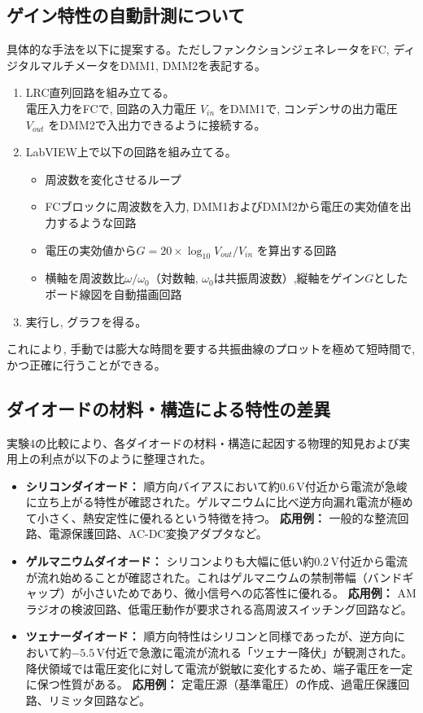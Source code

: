 \subsection{ゲイン特性の自動計測について}
具体的な手法を以下に提案する。ただしファンクションジェネレータをFC, ディジタルマルチメータをDMM1, DMM2を表記する。
\begin{enumerate}
    \item  LRC直列回路を組み立てる。\\
    電圧入力をFCで,
    回路の入力電圧 $V_{in}$ をDMM1で,
    コンデンサの出力電圧 $V_{out}$ をDMM2で入出力できるように接続する。
    \item  LabVIEW上で以下の回路を組み立てる。\\
    \begin{itemize}
		\item 周波数を変化させるループ
    	\item FCブロックに周波数を入力, DMM1およびDMM2から電圧の実効値を出力するような回路
    	\item 電圧の実効値から$G = 20\times\log_{10}{V_{out} / V_{in}}$ を算出する回路
    	\item 横軸を周波数比$\omega / \omega_0$（対数軸, $\omega_0$は共振周波数）,縦軸をゲイン$G$としたボード線図を自動描画回路
	\end{itemize}
    \item  実行し, グラフを得る。
\end{enumerate}
これにより,
手動では膨大な時間を要する共振曲線のプロットを極めて短時間で,
かつ正確に行うことができる。
  
\subsection{ダイオードの材料・構造による特性の差異}
実験4の比較により、各ダイオードの材料・構造に起因する物理的知見および実用上の利点が以下のように整理された。

\begin{itemize}
    \item \textbf{シリコンダイオード：}
    順方向バイアスにおいて約$0.6\,\mathrm{V}$付近から電流が急峻に立ち上がる特性が確認された。ゲルマニウムに比べ逆方向漏れ電流が極めて小さく、熱安定性に優れるという特徴を持つ。
    \textbf{応用例：} 一般的な整流回路、電源保護回路、AC-DC変換アダプタなど。

    \item \textbf{ゲルマニウムダイオード：}
    シリコンよりも大幅に低い約$0.2\,\mathrm{V}$付近から電流が流れ始めることが確認された。これはゲルマニウムの禁制帯幅（バンドギャップ）が小さいためであり、微小信号への応答性に優れる。
    \textbf{応用例：} AMラジオの検波回路、低電圧動作が要求される高周波スイッチング回路など。

    \item \textbf{ツェナーダイオード：}
    順方向特性はシリコンと同様であったが、逆方向において約$-5.5\,\mathrm{V}$付近で急激に電流が流れる「ツェナー降伏」が観測された。降伏領域では電圧変化に対して電流が鋭敏に変化するため、端子電圧を一定に保つ性質がある。
    \textbf{応用例：} 定電圧源（基準電圧）の作成、過電圧保護回路、リミッタ回路など。
\end{itemize}
